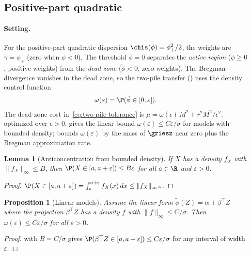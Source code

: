 \documentclass{article}
\newtheorem{lemma}[theorem]{Lemma}
\newtheorem{proposition}[theorem]{Proposition}
\begin{document}
\subsection{Positive-part quadratic}

\paragraph{Setting.} For the positive-part quadratic dispersion $\chis(\phi) = \phi_+^2/2$, the weights are $\gamma = \phi_+$ (zero when $\phi < 0$). The threshold $\tilde\phi = 0$ separates the \emph{active region} ($\tilde\phi \ge 0$, positive weights) from the \emph{dead zone} ($\tilde\phi < 0$, zero weights). The Bregman divergence vanishes in the dead zone, so the two-pile transfer () uses the density control function
\begin{equation}\label{eq:density-control}
\omega(\varepsilon) = \P(\tilde\phi \in [0, \varepsilon]).
\end{equation}
The dead-zone cost in~\eqref{eq:two-pile-tolerance} is $\mu = \omega(\epsilon)\, M^2 + r^2 M^2/\epsilon^2$, optimized over $\epsilon > 0$.  gives the linear bound $\omega(\varepsilon) \le C\varepsilon/\sigma$ for models with bounded density;  bounds $\omega(\varepsilon)$ by the mass of $\griesz$ near zero plus the Bregman approximation rate.

\begin{lemma}[Anticoncentration from bounded density]
\label{lem:subgaussian-anticonc}
If $X$ has a density $f_X$
with $\|f_X\|_\infty \le B$,
then $\P(X \in [a, a+\varepsilon]) \le B\varepsilon$
for all $a \in \R$ and $\varepsilon > 0$.
\end{lemma}
\begin{proof}
$\P(X \in [a, a+\varepsilon])
  = \int_a^{a+\varepsilon} f_X(x)\, dx
  \le \|f_X\|_\infty\, \varepsilon$.
\end{proof}

\begin{proposition}[Linear models]\label{prop:anticonc-linear}
Assume the linear form $\tilde\phi(Z) = \alpha + \beta^\top Z$ where the projection $\beta^\top Z$ has a density $f$ with $\|f\|_\infty \le C/\sigma$. Then $\omega(\varepsilon) \le C\varepsilon/\sigma$ for all $\varepsilon > 0$.
\end{proposition}

\begin{proof}
 with $B = C/\sigma$ gives $\P(\beta^\top Z \in [a, a+\varepsilon]) \le C\varepsilon/\sigma$ for any interval of width $\varepsilon$.
\end{proof}
\end{document}
